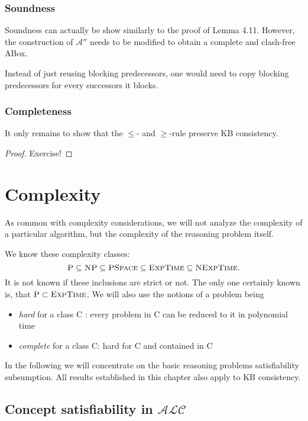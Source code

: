 \subsection*{Soundness}
Soundness can actually be show similarly to the proof of Lemma 4.11.
However, the construction of $\mathcal{A}''$ needs to be modified
to obtain a complete and clash-free ABox.

Instead of just reusing blocking predecessors,
one would need to copy blocking predecessors for every successors it blocks.

\subsection*{Completeness}
It only remains to show that the $ \leq$- and $ \geq$-rule preserve KB consistency.
\begin{proof}
	Exercise!
\end{proof}

\chapter{Complexity}
As common with complexity considerations,
we will not analyze the complexity of a particular algorithm,
but the complexity of the reasoning problem itself.

We know these complexity classes:
\[
	\textsc{P} \subseteq \textsc{NP} \subseteq \textsc{PSpace} \subseteq \textsc{ExpTime} \subseteq \textsc{NExpTime}
.\]
It is not known if these inclusions are strict or not.
The only one certainly known is, that $\textsc{P} \subset \textsc{ExpTime}$.
We will also use the notions of a problem being
\begin{itemize}
	\item \textit{hard} for a class \textsc{C} : every problem in \textsc{C} can be reduced to it in polynomial time
	\item \textit{complete} for a class \textsc{C}: hard for \textsc{C} and contained in \textsc{C} 
\end{itemize}

In the following we will concentrate on the basic reasoning problems satisfiability subsumption.
All results established in this chapter also apply to KB consistency.

\newpage
\section{Concept satisfiability in $\mathcal{ALC}$}

